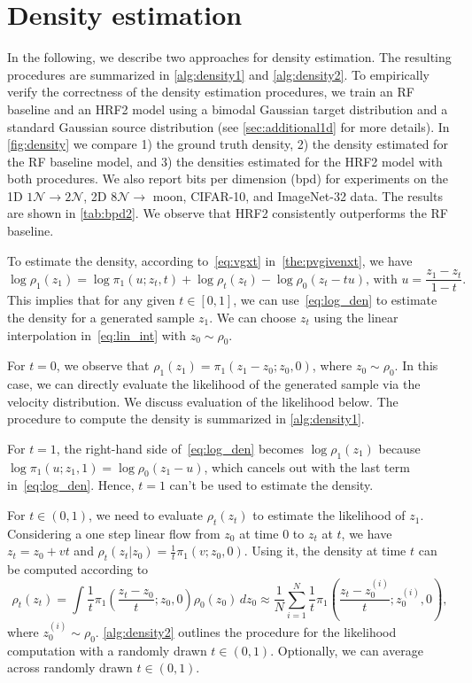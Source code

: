 \section{Density estimation}
\label{sec:density}
In the following, we describe two approaches for density estimation. The resulting procedures are summarized in \cref{alg:density1} and \cref{alg:density2}. To empirically verify the correctness of the density estimation procedures, 
we train an RF baseline and an HRF2 model using a bimodal Gaussian target distribution and a standard Gaussian source distribution (see \cref{sec:additional1d} for more details). In \cref{fig:density} we compare 1) the ground truth density, 2) the density estimated for the RF baseline model, and 3) the densities estimated for the HRF2 model with both procedures. 
We also report bits per dimension (bpd) for experiments on the 1D $1\mathcal{N}\to2\mathcal{N}$, 2D $8\mathcal{N}\to$ moon, CIFAR-10, and ImageNet-32 data.
The results are shown in \cref{tab:bpd2}. 
We observe that HRF2 consistently outperforms the RF baseline. 

To estimate the density, according to~\cref{eq:vgxt} in~\cref{the:pvgivenxt}, we have
\begin{equation}
\label{eq:log_den}
    \log \rho_1(z_1) = \log \pi_1(u; z_t, t) + \log \rho_t(z_t) - \log \rho_0(z_t - tu),\, \text{with } u = \frac{z_1 - z_t}{1-t}. 
\end{equation}
This implies that for any given $t \in [0, 1]$, we can use~\cref{eq:log_den} to estimate the density for a generated sample $z_1$. We can choose $z_t$ using the linear interpolation in~\cref{eq:lin_int} with $z_0 \sim \rho_0$. 

For $t = 0$, we observe that $\rho_1(z_1) = \pi_1(z_1 - z_0; z_0, 0)$, where $z_0 \sim \rho_0$. In this case, we can directly evaluate the likelihood of the generated sample via the velocity distribution. We discuss evaluation of the likelihood %
below. The procedure to compute the density is summarized in \cref{alg:density1}.

For $t = 1$, the right-hand side of~\cref{eq:log_den} becomes $\log \rho_1(z_1)$ because $\log \pi_1(u; z_1, 1) = \log \rho_0(z_1 - u)$, which cancels out with the last term in~\cref{eq:log_den}. Hence, $t=1$ can't be used to estimate the density.

For $ t\in (0, 1)$, we need to evaluate $\rho_t(z_t)$ to estimate the likelihood of $z_1$. Considering a one step linear flow from $z_0$ at time $0$ to $z_t$ at $t$, we have $z_t = z_0 + v t$ and $\rho_t(z_t | z_0) = \frac{1}{t} \pi_1(v; z_0, 0)$. Using it, the density at time $t$ can be computed according to 
\begin{equation}
\label{eq:rho_t_est}
\rho_t(z_t) = \int \frac{1}{t} \pi_1\left( \frac{z_t - z_0}{t} ; z_0, 0\right) \rho_0(z_0)\, d z_0 \approx \frac{1}{N} \sum_{i = 1}^N \frac{1}{t}\pi_1\left( \frac{z_t - z^{(i)}_0}{t}; z^{(i)}_0, 0\right), 
\end{equation}
where $z^{(i)}_0 \sim \rho_0$.
\cref{alg:density2} outlines the procedure for the likelihood computation with a randomly drawn $t \in (0, 1)$. Optionally, we can average across randomly drawn $t\in(0,1)$. 

